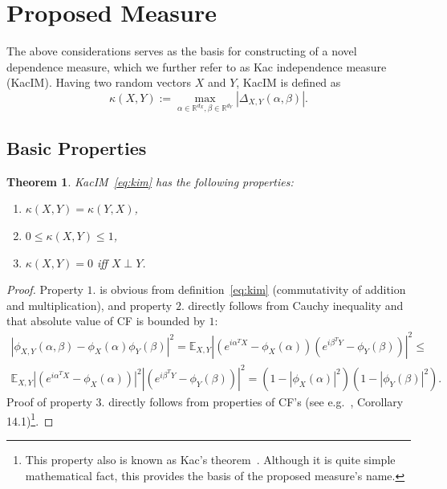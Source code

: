 \documentclass{article}
\newtheorem{theorem}{Theorem}
\begin{document}
\section{Proposed Measure}
\label{section:proposed_method}



\noindent The above considerations serves as the basis for constructing of a novel dependence measure, which we further refer to as Kac independence measure (KacIM). Having two random vectors $X$ and $Y$, KacIM is defined as
\begin{equation}
\label{eq:kim}
\kappa(X,Y):= \max_{\alpha \in \mathbb{R}^{d_{X}}, \beta \in \mathbb{R}^{d_{Y}}} |\Delta_{X,Y}(\alpha,\beta)|.
\end{equation}


\subsection{Basic Properties}
\begin{theorem}
	\label{thm:properties}
	KacIM~\eqref{eq:kim} has the following properties:
	\begin{enumerate} 
		\item $\kappa(X,Y) = \kappa(Y,X)$,
		\item $0 \leq \kappa(X,Y) \leq 1$,
		\item $\kappa(X,Y) = 0$ iff $X\perp Y$.
	\end{enumerate}    
\end{theorem}


\begin{proof}
	Property $\textit{1.}$ is obvious from definition~\eqref{eq:kim} (commutativity of addition and multiplication), and property $\textit{2.}$ directly follows from Cauchy inequality and that absolute value of CF is bounded by $1$:
	\begin{multline*}
	|\phi_{X,Y}(\alpha, \beta)  -\phi_{X}(\alpha) \phi_{Y}(\beta)|^{2} =
	\mathbb{E}_{X,Y} |( e^{i\alpha^{T}X} - \phi_{X}(\alpha) )(e^{i\beta^{T}Y}- \phi_{Y}(\beta) )|^{2} \leq \\
	\mathbb{E}_{X,Y} |( e^{i\alpha^{T}X} - \phi_{X}(\alpha) )|^{2} |(e^{i\beta^{T}Y}- \phi_{Y}(\beta) )|^{2}  = (1 - |\phi_{X}(\alpha)|^{2}) (1 - |\phi_{Y}(\beta)|^{2}).
	\end{multline*}
	Proof of property $\textit{3.}$ directly follows from properties of CF's (see e.g.~\cite{Jacod}, Corollary 14.1)\footnote{This property also is known as Kac's theorem~\cite{KacTheorem}. Although it is quite simple mathematical fact, this provides the basis of the proposed measure's name.}.	
\end{proof}
\end{document}
